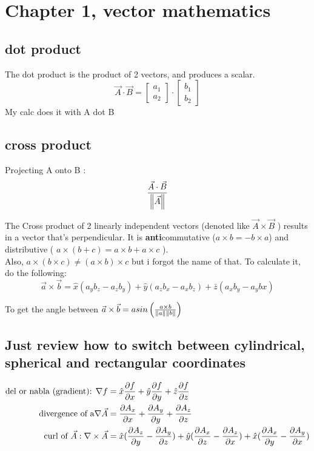 \documentclass[12pt]{extarticle} %
\begin{document}
\newcommand\abs[1]{\left|#1\right|} %
\newcommand\magnitude[1]{\left\Vert #1 \right\Vert}
\newcommand\vectoo[1]{\begin{bmatrix} #1 \end{bmatrix}}
\newcommand{\seq}[2][0]{\left\{ #2 \right\}_{n=#1}}
\newtheorem{theorem}{Theorem}
\newtheorem*{theorem*}{Theorem}
\newtheorem*{definition}{Definition}

\section{Chapter 1, vector mathematics}

\subsection*{dot product}
The dot product is the product of 2 vectors, and produces a scalar.
$$
\vec{A} \cdot \vec{B} = \vectoo{a_1 \\ a_2} \cdot \vectoo{b_1 \\ b_2}
$$
My calc does it with A dot B

\subsection*{cross product}
Projecting A onto B : 
$${ \vec{A} \cdot \vec{B} \over \magnitude{\vec{A}}}$$


The Cross product of 2 linearly independent vectors (denoted like $\vec{A} \times \vec{B}$ ) results in a vector that's
perpendicular. 
It is \textbf{anti}commutative ($a \times b = - b \times a$) and distributive ( $a \times (b + c ) = a \times b + a \times c$ ). \\
Also, $a \times (b \times c) \not= (a \times b) \times c$ but i forgot the name of that.
To calculate it, do the following:
$$
\vec{a} \times \vec{b} = \hat{x} (a_y b_z - a_z b_y) + \hat{y} (a_z b_x - a_x b_z)  + \bar{z} ( a_x b_y - a_y bx)
$$

To get the angle between $\vec{a} \times \vec{b} = asin \left( a \times b \over \magnitude{a} \magnitude{b}  \right)$

\subsection*{Just review how to switch between cylindrical, spherical and rectangular coordinates}

$$
\begin{aligned}
    \text{del or nabla (gradient): } \nabla f &= \hat{x} {\partial f \over \partial x} 
+ \hat{y} {\partial f \over \partial y} + \hat{z} {\partial f \over \partial z} \\
\text{divergence of a} \nabla \vec{A} &= {\partial A_x \over \partial x} 
+ {\partial A_y \over \partial y} + {\partial A_z \over \partial z} \\
\text{curl of } \vec{A} : \nabla \times \vec{A} &=  \hat{x} ({\partial A_z \over \partial y} - {\partial A_y \over \partial z}) + 
\hat{y} ({\partial A_x \over \partial z} - {\partial A_z \over \partial x}) +
\hat{x} ({\partial A_x \over \partial y} - {\partial A_y \over \partial x}) 
\end{aligned}
$$
\end{document}
